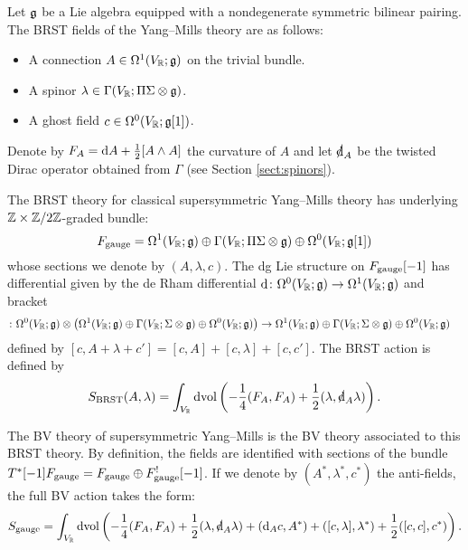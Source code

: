 \documentclass[10pt, oneside]{article}
\begin{document}
Let $\mathfrak g$ be a Lie algebra equipped with a nondegenerate symmetric bilinear pairing. The BRST fields of the Yang--Mills theory are as follows:
\begin{itemize}
\item A connection $A \in \Omega^1(V_\mathbb R; \mathfrak g)$ on the trivial bundle.

\item A spinor $\lambda \in \Gamma(V_\mathbb R; \Pi \Sigma \otimes \mathfrak g)$.

\item A ghost field $c\in\Omega^0(V_\mathbb R; \mathfrak g[1])$.
\end{itemize}

Denote by $F_A = {\rm d} A + \frac{1}{2}[A\wedge A]$ the curvature of $A$ and let $\sd\d_A$ be the twisted Dirac operator obtained from $\Gamma$ (see Section \ref{sect:spinors}).

\begin{definition}
\label{def:sym}
The BRST theory for classical supersymmetric Yang--Mills theory has underlying $\mathbb Z \times \mathbb Z/2\mathbb Z$-graded bundle:
\[
F_{\rm gauge} = \Omega^1(V_\mathbb R; \mathfrak g) \oplus \Gamma(V_\mathbb R; \Pi \Sigma \otimes \mathfrak g) \oplus \Omega^0(V_\mathbb R; \mathfrak g[1])
\]
whose sections we denote by $(A, \lambda, c)$.  
The dg Lie structure on $F_{\rm gauge}[-1]$ has differential given by the de Rham differential ${\rm d} \colon \Omega^0(V_{\mathbb R} ; \mathfrak g) \to \Omega^1(V_{\mathbb R} ; \mathfrak g)$ and bracket
\begin{align*}
[-,-]  \colon  \Omega^0(V_{\RR} ; \fg) \otimes \left(\Omega^1(V_{\RR} ; \fg) \oplus \Gamma(V_\RR ; \Sigma \otimes \fg) \oplus \Omega^0(V_{\RR} ; \fg) \right) & \to  \Omega^1(V_{\RR} ; \fg) \oplus \Gamma(V_\RR ; \Sigma \otimes \fg) \oplus \Omega^0(V_\RR ; \fg)
\end{align*}
defined by $[c, A + \lambda + c'] = [c, A] + [c, \lambda] + [c,c']$.
The BRST action is defined by
\[
S_{\mr{BRST}}(A, \lambda) = \int_{V_\RR}\dvol \left( -\frac{1}{4} (F_A, F_A) + \frac{1}{2}(\lambda, \sd \d_A \lambda)\right).
\]
\end{definition}

The BV theory of supersymmetric Yang--Mills is the BV theory associated to this BRST theory. 
By definition, the fields are identified with sections of the bundle $T^*[-1] F_{\rm gauge} = F_{\rm gauge} \oplus F_{\rm gauge}^! [-1]$. 
If we denote by $(A^*, \lambda^*,c^*)$ the anti-fields, the full BV action takes the form:
\begin{equation}
S_{\gauge} = \int_{V_\RR}\dvol \left( -\frac{1}{4} (F_A, F_A) + \frac{1}{2}(\lambda, \sd\d_A \lambda) + (\d_A c, A^*) + ([c, \lambda], \lambda^*) + \frac{1}{2}([c, c], c^*)\right).
\label{eq:YMBVaction}
\end{equation}
\end{document}
